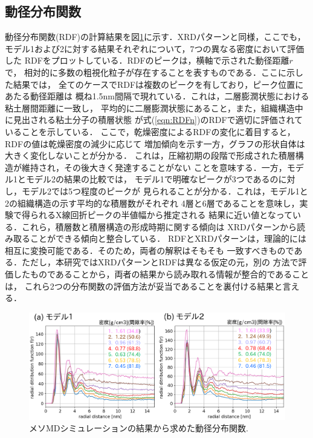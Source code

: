 \subsection{動径分布関数}
動径分布関数(RDF)の計算結果を図\ref{fig:fig7}に示す．XRDパターンと同様，ここでも，
モデル1および2に対する結果それぞれについて，7つの異なる密度において評価した
RDFをプロットしている．RDFのピークは，横軸で示された動径距離$r$で，
相対的に多数の粗視化粒子が存在することを表すものである．ここに示した結果では，
全てのケースでRDFは複数のピークを有しており，ピーク位置にあたる動径距離は
概ね1.5nm間隔で現れている．これは，二層膨潤状態における粘土層間距離に一致し，
平均的に二層膨潤状態にあること，また，組織構造中に見出される粘土分子の積層状態
が式(\ref{eqn:RDFn})のRDFで適切に評価されていることを示している．
ここで，乾燥密度によるRDFの変化に着目すると，RDFの値は乾燥密度の減少に応じて
増加傾向を示す一方，グラフの形状自体は大きく変化しないことが分かる．
これは，圧縮初期の段階で形成された積層構造が維持され，その後大きく発達することがない
ことを意味する．一方，モデル1とモデル2の結果の比較では，
モデル1で明確なピークが3つであるのに対し，モデル2では5つ程度のピークが
見られることが分かる．これは，モデル1と2の組織構造の示す平均的な積層数がそれぞれ
4層と6層であることを意味し，実験で得られるX線回折ピークの半値幅から推定される
結果に近い値となっている．これら，積層数と積層構造の形成時期に関する傾向は
XRDパターンから読み取ることができる傾向と整合している．
RDFとXRDパターンは，理論的には相互に変換可能である．そのため，両者の解釈はそもそも
一致すべきものである．ただし，本研究ではXRDパターンとRDFは異なる仮定の元，別の
方法で評価したものであることから，両者の結果から読み取れる情報が整合的であることは，
これら2つの分布関数の評価方法が妥当であることを裏付ける結果と言える．
\begin{figure}[h]
	\begin{center}
	\includegraphics[width=1.0\linewidth]{Figs/fig7.eps} 
	\end{center}
	\caption{
		メソMDシミュレーションの結果から求めた動径分布関数.
	} 
	\label{fig:fig7}
\end{figure}
